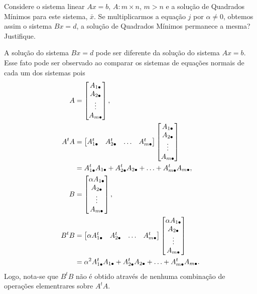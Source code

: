 \begin{questions}
    \question Considere o sistema linear $A x = b$, $A : m \times n$, $m > n$ e a solu\c{c}\~{a}o de Quadrados M\'{i}nimos para este sistema, $\bar{x}$. Se multiplicarmos a equa\c{c}\~{a}o $j$ por $\alpha \neq 0$, obtemos assim o sistema $B x = d$, a solu\c{c}\~{a}o de Quadrados M\'{i}nimos permanece a mesma? Justifique.
    \begin{solution}
        A solu\c{c}\~{a}o do sistema $B x = d$ pode ser diferente da solu\c{c}\~{a}o do sistema $A x = b$. Esse fato pode ser observado ao comparar os sistemas de equa\c{c}\~{o}es normais de cada um dos sistemas pois
        \begin{align*}
            A &= \begin{bmatrix}
                A_{1 \bullet} \\
                A_{2 \bullet} \\
                \vdots \\
                A_{m \bullet}
            \end{bmatrix}, \\
            A^t A &= \begin{bmatrix}
                A_{1 \bullet}^t & A_{2 \bullet}^t & \ldots & A_{m \bullet}^t
            \end{bmatrix} \begin{bmatrix}
                A_{1 \bullet} \\
                A_{2 \bullet} \\
                \vdots \\
                A_{m \bullet}
            \end{bmatrix} \\
            &= A_{1 \bullet}^t A_{1 \bullet} + A_{2 \bullet}^t A_{2 \bullet} + \ldots + A_{m \bullet}^t A_{m \bullet}, \\
            B &= \begin{bmatrix}
                \alpha A_{1 \bullet} \\
                A_{2 \bullet} \\
                \vdots \\
                A_{m \bullet}
            \end{bmatrix}, \\
            B^t B &= \begin{bmatrix}
                \alpha A_{1 \bullet}^t & A_{2 \bullet}^t & \ldots & A_{m \bullet}^t
            \end{bmatrix} \begin{bmatrix}
                \alpha A_{1 \bullet} \\
                A_{2 \bullet} \\
                \vdots \\
                A_{m \bullet}
            \end{bmatrix} \\
            &= \alpha^2 A_{1 \bullet}^t A_{1 \bullet} + A_{2 \bullet}^t A_{2 \bullet} + \ldots + A_{m \bullet}^t A_{m \bullet}.
        \end{align*}
        Logo, nota-se que $B^t B$ n\~{a}o \'{e} obtido atrav\'{e}s de nenhuma combina\c{c}\~{a}o de opera\c{c}\~{o}es elementrares sobre $A^t A$.
    \end{solution}


\end{questions}
